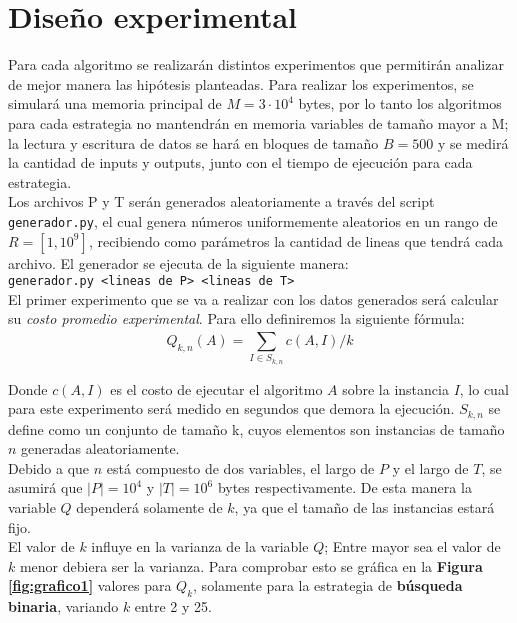 \documentclass[11pt]{article}
\begin{document}
\newpage
\section{Diseño experimental}

Para cada algoritmo se realizarán distintos experimentos que permitirán analizar de mejor manera las hipótesis planteadas. Para realizar los experimentos, se simulará una memoria principal de $M=3\cdot 10^4$ bytes, por lo tanto los algoritmos para cada estrategia no mantendrán en memoria variables de tamaño mayor a M; la lectura y escritura de datos se hará en bloques de tamaño $B=500$ y se medirá la cantidad de inputs y outputs, junto con el tiempo de ejecución para cada estrategia. \\ \newline
Los archivos P y T serán generados aleatoriamente a través del script \texttt{generador.py}, el cual genera números uniformemente aleatorios en un rango de $R=[1, 10^9]$, recibiendo como parámetros la cantidad de lineas que tendrá cada archivo. El generador se ejecuta de la siguiente manera:\\ \newline
\texttt{generador.py <lineas de P>\; <lineas de T>}\\ \newline
El primer experimento que se va a realizar con los datos generados será calcular su \textit{costo promedio experimental}. Para ello definiremos la siguiente fórmula:
$$
Q_{k,n}(A) = \sum_{I \in S_{k,n}}^{}c(A,I) / k
$$

Donde $c(A,I)$ es el costo de ejecutar el algoritmo $A$ sobre la instancia $I$, lo cual para este experimento será medido en segundos que demora la ejecución. $S_{k,n}$ se define como un conjunto de tamaño k, cuyos elementos son instancias de tamaño $n$ generadas aleatoriamente.\\ \newline
Debido a que $n$ está compuesto de dos variables, el largo de $P$ y el largo de $T$, se asumirá que $|P|=10^4$ y $|T|=10^6$ bytes respectivamente. De esta manera la variable $Q$ dependerá solamente de $k$, ya que el tamaño de las instancias estará fijo.\\ \newline 
El valor de $k$ influye en la varianza de la variable $Q$; Entre mayor sea el valor de $k$ menor debiera ser la varianza. Para comprobar esto se gráfica en la \textbf{Figura \ref{fig:grafico1}} valores para $Q_k$, solamente para la estrategia de \textbf{búsqueda binaria}, variando $k$ entre 2 y 25. 
\end{document}
